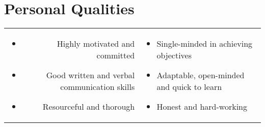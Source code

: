 \section*{Personal Qualities}

\begin{tabular}{rl}

\parbox[t]{0.5\textwidth}{
	\begin{itemize}
		\item Highly motivated and committed
		\item Good written and verbal communication skills
		\item Resourceful and thorough
	\end{itemize}
}

&

\parbox[t]{0.5\textwidth}{
	\begin{itemize}
		\item Single-minded in achieving objectives
		\item Adaptable, open-minded and quick to learn
		\item Honest and hard-working
	\end{itemize}
}

\end{tabular}


